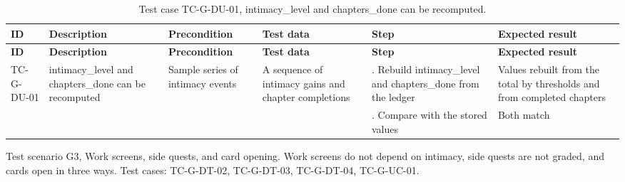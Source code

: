 {\footnotesize{}\renewcommand{\arraystretch}{1.1}
\begin{longtable}{|>{\raggedright\arraybackslash}p{}|>{\raggedright\arraybackslash}p{}|>{\raggedright\arraybackslash}p{}|>{\raggedright\arraybackslash}p{}|>{\raggedright\arraybackslash}p{}|>{\raggedright\arraybackslash}p{}|}
\caption{Test case TC-G-DU-01, intimacy\_\allowbreak{}level and chapters\_\allowbreak{}done can be recomputed.} \\
\hline
\textbf{ID} & \textbf{Description} & \textbf{Precondition} & \textbf{Test data} & \textbf{Step} & \textbf{Expected result} \\ \hline
\endfirsthead
\hline
\textbf{ID} & \textbf{Description} & \textbf{Precondition} & \textbf{Test data} & \textbf{Step} & \textbf{Expected result} \\ \hline
\endhead
TC-G-DU-01 & intimacy\_\allowbreak{}level and chapters\_\allowbreak{}done can be recomputed & Sample series of intimacy events & A sequence of intimacy gains and chapter completions & 1. Rebuild intimacy\_\allowbreak{}level and chapters\_\allowbreak{}done from the ledger & Values rebuilt from the total by thresholds and from completed chapters \\ \cline{5-6}
 &  &  &  & 2. Compare with the stored values & Both match \\ \hline
\end{longtable}
}

Test scenario G3, Work screens, side quests, and card opening. Work screens do not depend on intimacy, side quests are not graded, and cards open in three ways. Test cases: TC-G-DT-02, TC-G-DT-03, TC-G-DT-04, TC-G-UC-01.

